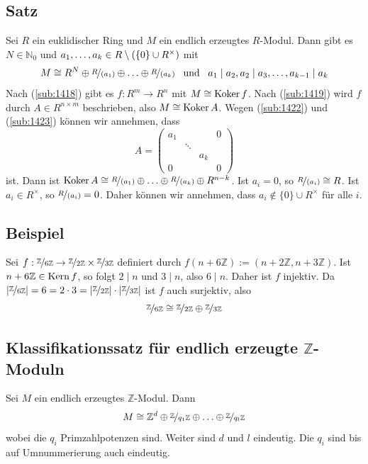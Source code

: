 \subsection[Satz: Konstruktion eines isomorphen Moduls mit $R^n$]{Satz} %
\label{sub:1425}
Sei $R$ ein euklidischer Ring und $M$ ein endlich erzeugtes $R$-Modul. Dann gibt es $N \in \mathds{N}_0$ und 
$a_1, \ldots , a_k \in R \setminus \enbrace{ \{0\} \cup R^\times} $ mit
\[
	M \cong R^N \oplus \nicefrac{R}{(a_1)} \oplus \ldots \oplus \nicefrac{R}{(a_k)} \enspace \text{ und }\enspace a_1 \mid a_2, a_2 \mid a_3, \ldots , a_{k-1} \mid a_k
\]
Nach (\ref{sub:1418}) gibt es $f : R^m \to R^n$ mit $M \cong \koker f$. Nach (\ref{sub:1419}) wird $f$ durch $A \in R^{n \times m}$ beschrieben, also 
$M \cong \koker A$. Wegen (\ref{sub:1422}) und (\ref{sub:1423}) können wir annehmen, dass 
\[
	A= \begin{pmatrix}
		a_1 & & & 0 \\
		 & \ddots & & \\
		 & & a_k & \\
		 0 & & & 0
	\end{pmatrix}
\]
ist. Dann ist $\koker A \cong \nicefrac{R}{(a_1)} \oplus \ldots \oplus \nicefrac{R}{(a_k)} \oplus R^{n-k}$. Ist $a_i = 0$, so $\nicefrac{R}{(a_i)} \cong R$. Ist 
$a_i \in R^\times$, so $\nicefrac{R}{(a_i)} = 0$. Daher können wir annehmen, dass $a_i \not\in \{0\} \cup R^\times$ für alle $i$. \bewende

\subsection{Beispiel} %
\label{sub:1426}
Sei $f : \nicefrac{\mathds{Z}}{6 \mathds{Z}} \to \nicefrac{\mathds{Z}}{2 \mathds{Z}} \times \nicefrac{\mathds{Z}}{3 \mathds{Z}}$ definiert durch
$f(n + 6\mathds{Z}) := (n+2\mathds{Z}, n+3\mathds{Z})$. Ist $n+6\mathds{Z} \in \Kern f$, so folgt $2 \mid n$ und $3 \mid n$, also $6 \mid n$. Daher ist $f$ injektiv.
Da $\abs{\nicefrac{\mathds{Z}}{6 \mathds{Z}}} = 6 = 2 \cdot 3 = \abs{\nicefrac{\mathds{Z}}{2 \mathds{Z}}} \cdot \abs{\nicefrac{\mathds{Z}}{3 \mathds{Z}}}$ ist $f$ auch
surjektiv, also 
\[
	\nicefrac{\mathds{Z}}{6 \mathds{Z}} \cong \nicefrac{\mathds{Z}}{2 \mathds{Z}} \oplus \nicefrac{\mathds{Z}}{3 \mathds{Z}}
\]


\subsection{Klassifikationssatz für endlich erzeugte $\mathds{Z}$-Moduln} %
\label{sub:1428}
Sei $M$ ein endlich erzeugtes $\mathds{Z}$-Modul. Dann 
\[
	M \cong \mathds{Z}^d \oplus \nicefrac{\mathds{Z}}{q_1 \mathds{Z}} \oplus \ldots \oplus \nicefrac{\mathds{Z}}{q_l \mathds{Z}}
\]
wobei die $q_i$ Primzahlpotenzen sind. Weiter sind $d$ und $l$ eindeutig. Die $q_i$ sind bis auf Umnummerierung auch eindeutig.
